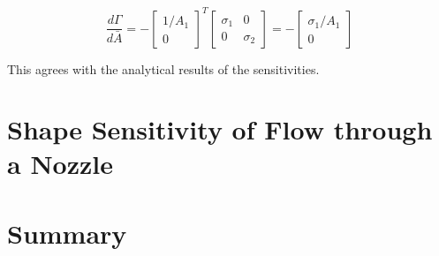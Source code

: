 \begin{equation}
    \frac{d \Gamma}{d \bar{A}} = 
    -\begin{bmatrix}
    1/A_1 \\
    0
    \end{bmatrix}^T
    \begin{bmatrix}
    \sigma_1 & 0 \\
    0 & \sigma_2
    \end{bmatrix} =
    -
    \begin{bmatrix}
    \sigma_1 / A_1 \\
    0
    \end{bmatrix}
\end{equation}

This agrees with the analytical results of the sensitivities. 



\section{Shape Sensitivity of Flow through a Nozzle}

\section{Summary}
